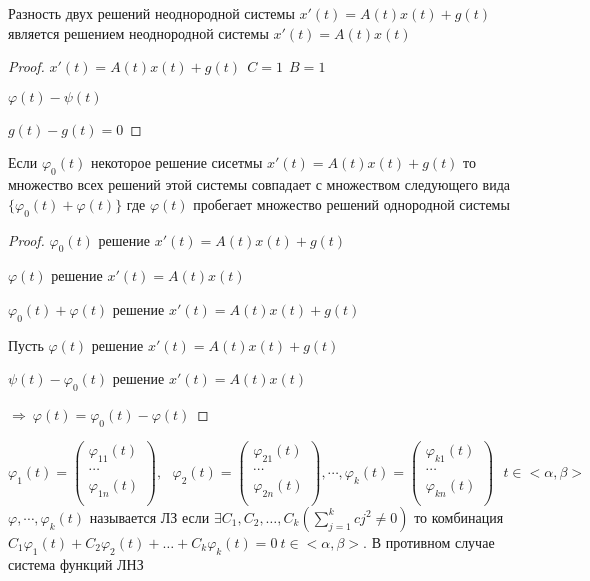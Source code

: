 \begin{block}[Следствие 1]
  Разность двух решений неоднородной системы $x'(t) = A(t)x(t) + g(t)$
  является решением неоднородной системы $x'(t) = A(t)x(t)$
\end{block}

\begin{proof}
  $x'(t) = A(t)x(t) + g(t) ~~ C = 1 ~~ B = 1$

  $\varphi(t) - \psi(t)$

  $g(t) - g(t) = 0$
\end{proof}

\begin{block}[Слeдствие 2]
  Если $\varphi_0(t)$ некоторое решение сисетмы $x'(t) = A(t)x(t) + g(t)$ то
  множество всех решений этой системы совпадает с множеством следующего вида
  $\{\varphi_0(t) + \varphi(t)\}$ где $\varphi(t)$ пробегает множество решений
  однородной системы
\end{block}

\begin{proof}
  $\varphi_0(t)$ решение $x'(t) = A(t)x(t) + g(t)$

  $\varphi(t)$ решение $x'(t) = A(t)x(t)$

  $\varphi_0(t) + \varphi(t)$ решение $x'(t) = A(t)x(t) + g(t)$

  Пусть $\varphi(t)$ решение $x'(t) = A(t)x(t) + g(t)$

  $\psi(t) - \varphi_0(t)$ решение $x'(t) = A(t)x(t)$

  $\Rightarrow ~ \varphi(t) = \varphi_0(t) - \varphi(t)$
\end{proof}

\begin{define}
  $$
  \varphi_1 (t) =
  \left(
  \begin{array}{c}
    \varphi_{11}(t) \\
    \cdots \\
    \varphi_{1n}(t) \\
  \end{array}
  \right),~~~
  \varphi_2 (t) =
  \left(
  \begin{array}{c}
    \varphi_{21}(t) \\
    \cdots \\
    \varphi_{2n}(t) \\
  \end{array}
  \right), \cdots,
  \varphi_k (t) =
  \left(
  \begin{array}{c}
    \varphi_{k1}(t) \\
    \cdots \\
    \varphi_{kn}(t) \\
  \end{array}
  \right) ~~~ t \in <\alpha, \beta>
  $$
  $\varphi, \cdots, \varphi_k(t)$ называется ЛЗ если $\exists C_1, C_2, \ldots,
  C_k(\sum_{j=1}^k cj^2 \not= 0)$ то комбинация $C_1\varphi_1(t) +
  C_2\varphi_2(t) + \ldots + C_k\varphi_k(t) = 0 ~ t \in <\alpha, \beta>$. В
  противном случае система функций ЛНЗ
\end{define}


